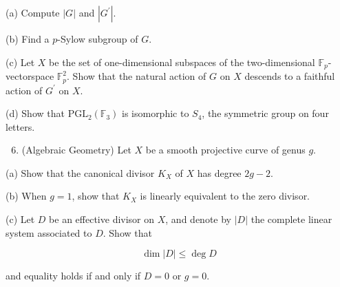\documentclass[10pt]{article}
\begin{document}
(a) Compute $|G|$ and $\left|G^{\prime}\right|$.

(b) Find a $p$-Sylow subgroup of $G$.

(c) Let $X$ be the set of one-dimensional subspaces of the two-dimensional $\mathbb{F}_{p}$-vectorspace $\mathbb{F}_{p}^{2}$. Show that the natural action of $G$ on $X$ descends to a faithful action of $G^{\prime}$ on $X$.

(d) Show that $\mathrm{PGL}_{2}\left(\mathbb{F}_{3}\right)$ is isomorphic to $S_{4}$, the symmetric group on four letters.

\begin{enumerate}
  \setcounter{enumi}{5}
  \item (Algebraic Geometry) Let $X$ be a smooth projective curve of genus $g$.
\end{enumerate}

(a) Show that the canonical divisor $K_{X}$ of $X$ has degree $2 g-2$.

(b) When $g=1$, show that $K_{X}$ is linearly equivalent to the zero divisor.

(c) Let $D$ be an effective divisor on $X$, and denote by $|D|$ the complete linear system associated to $D$. Show that

$$
\operatorname{dim}|D| \leq \operatorname{deg} D
$$

and equality holds if and only if $D=0$ or $g=0$.
\end{document}
